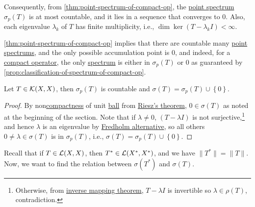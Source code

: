 \begin{remark}
	Consequently, from \autoref{thm:point-spectrum-of-compact-op}, the \hyperref[def:point-spectrum]{point spectrum} \(\sigma _p(T)\) is at most countable, and it lies in a sequence that converges to \(0\). Also, each eigenvalue \(\lambda _k\) of \(T\) has finite multiplicity, i.e., \(\dim \ker (T-\lambda _k I) < \infty \).
\end{remark}

\autoref{thm:point-spectrum-of-compact-op} implies that there are countable many \hyperref[def:point-spectrum]{point spectrums}, and the only possible accumulation point is \(0\), and indeed, for a \hyperref[def:compact-op]{compact operator}, the only \hyperref[def:spectrum-point]{spectrum} is either in \(\sigma _p(T)\) or \(0\) as guaranteed by \autoref{prop:classification-of-spectrum-of-compact-op}.

\begin{proposition}\label{prop:classification-of-spectrum-of-compact-op}
	Let \(T\in \mathcal{\MakeUppercase{k}} (X, X)\), then \(\sigma _p(T)\) is countable and \(\sigma (T) = \sigma _p(T) \cup \left\{ 0 \right\} \).
\end{proposition}
\begin{proof}
	By non\hyperref[def:compact]{compactness} of unit \hyperref[def:ball]{ball} from \hyperref[thm:Riesz]{Riesz's theorem}, \(0\in \sigma (T)\) as noted at the beginning of the section. Note that if \(\lambda \neq 0\), \((T - \lambda I)\) is not surjective,\footnote{Otherwise, from \hyperref[thm:inverse-mapping]{inverse mapping theorem}, \(T-\lambda I\) is invertible so \(\lambda \in \rho (T)\), contradiction.} and hence \(\lambda \) is an eigenvalue by \hyperref[thm:Fredholm-alternative]{Fredholm alternative}, so all others \(0 \neq \lambda \in \sigma (T)\) is in \(\sigma _p(T)\), i.e., \(\sigma (T) = \sigma _p(T) \cup \left\{ 0 \right\} \).
\end{proof}

Recall that if \(T\in \mathcal{\MakeUppercase{l}} (X, X)\), then \(T^{\ast} \in \mathcal{\MakeUppercase{l}} (X^{\ast} , X^{\ast} )\), and we have \(\lVert T^{\ast}  \rVert = \lVert T \rVert \). Now, we want to find the relation between \(\sigma (T^{\ast} )\) and \(\sigma (T)\).

